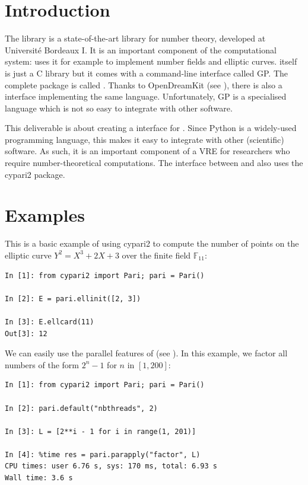 \documentclass{deliverablereport}
\author{Jeroen Demeyer}
\begin{document}
\maketitle
\tableofcontents


\section{Introduction}

The \Pari library is a state-of-the-art library for number theory,
developed at Universit\'e Bordeaux I.
It is an important component of the \Sage computational system:
\Sage uses it for example to implement number fields and elliptic curves.
\Pari itself is just a C library but it comes with a command-line interface called GP.
The complete package is called \PariGP.
Thanks to OpenDreamKit (see ),
there is also a \Jupyter interface implementing the same language.
Unfortunately, GP is a specialised language which is not so easy
to integrate with other software.

This deliverable is about creating a \Python interface for \PariGP.
Since Python is a widely-used programming language,
this makes it easy to integrate \PariGP with other (scientific) software.
As such, it is an important component of a VRE
for researchers who require number-theoretical computations.
The interface between \Sage and \PariGP also uses the cypari2 package.

\clearpage
\section{Examples}

This is a basic example of using cypari2 to compute
the number of points on the elliptic curve $Y^2 = X^3 + 2X + 3$
over the finite field $\mathbb{F}_{11}$:
\begin{verbatim}
In [1]: from cypari2 import Pari; pari = Pari()

In [2]: E = pari.ellinit([2, 3])

In [3]: E.ellcard(11)
Out[3]: 12
\end{verbatim}

We can easily use the parallel features of \PariGP (see ).
In this example, we factor all numbers of the form $2^n - 1$ for $n$ in $[1, 200]$:
\begin{verbatim}
In [1]: from cypari2 import Pari; pari = Pari()

In [2]: pari.default("nbthreads", 2)

In [3]: L = [2**i - 1 for i in range(1, 201)]

In [4]: %time res = pari.parapply("factor", L)
CPU times: user 6.76 s, sys: 170 ms, total: 6.93 s
Wall time: 3.6 s
\end{verbatim}
\end{document}
